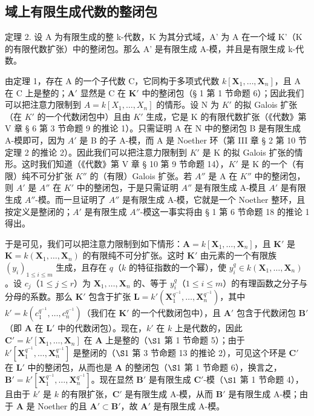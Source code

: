 \subsection{域上有限生成代数的整闭包}

定理 2. 设 A 为有限生成的整 k-代数，K 为其分式域，A' 为 A 在一个域 K'（K 的有限代数扩张）中的整闭包。那么 A' 是有限生成 A-模，并且是有限生成 k-代数。

由定理 1，存在 A 的一个子代数 C，它同构于多项式代数 \(k[\mathbf{X}_1, \ldots, \mathbf{X}_n]\)，且 A 在 C 上是整的；\(\mathbf{A}'\) 显然是 C 在 \(\mathbf{K}'\) 中的整闭包（§ 1 第 1 节命题 6）；因此我们可以把注意力限制到 \(A = k[X_{1}, \ldots, X_{n}]\) 的情形。设 N 为 \(K'\) 的拟 Galois 扩张（在 \(K'\) 的一个代数闭包中）且由 \(K'\) 生成，它是 K 的有限代数扩张（《代数》第 V 章 § 6 第 3 节命题 9 的推论 1）。只需证明 A 在 N 中的整闭包 B 是有限生成 A-模即可，因为 \(A'\) 是 B 的子 A-模，而 A 是 Noether 环（第 III 章 § 2 第 10 节定理 2 的推论 2）。因此我们可以把注意力限制到 \(K'\) 是 K 的拟 Galois 扩张的情形。这时我们知道（《代数》第 V 章 § 10 第 9 节命题 14），\(K'\) 是 K 的一个（有限）纯不可分扩张 \(K''\) 的（有限）Galois 扩张。若 \(A''\) 是 A 在 \(K''\) 中的整闭包，则 \(A'\) 是 \(A''\) 在 \(K'\) 中的整闭包，于是只需证明 \(A''\) 是有限生成 A-模且 \(A'\) 是有限生成 \(A''\)-模。而一旦证明了 \(A''\) 是有限生成 A-模，它就是一个 Noether 整环，且按定义是整闭的；\(A'\) 是有限生成 \(A''\)-模这一事实将由 § 1 第 6 节命题 18 的推论 1 得出。

于是可见，我们可以把注意力限制到如下情形：\(\mathbf{A} = k[\mathbf{X}_1, \ldots, \mathbf{X}_n]\)，且 \(\mathbf{K}'\) 是 \(\mathbf{K} = k(\mathbf{X}_1, \ldots, \mathbf{X}_n)\) 的有限纯不可分扩张。这时 \(\mathbf{K}'\) 由元素的一个有限族 \((y_i)_{1 \leqslant i \leqslant m}\) 生成，且存在 \(q\)（\(k\) 的特征指数的一个幂），使 \(y_i^q \in k(\mathbf{X}_1, \ldots, \mathbf{X}_n)\)。设 \(c_j\)（\(1 \leqslant j \leqslant r\)）为 \(\mathbf{X}_1, \ldots, \mathbf{X}_n\) 的、等于 \(y_i^q\)（\(1 \leqslant i \leqslant m\)）的有理函数之分子与分母的系数。那么 \(\mathbf{K}'\) 包含于扩张 \(\mathbf{L} = k'(\mathbf{X}_1^{q^{-1}}, \ldots, \mathbf{X}_n^{q^{-1}})\)，其中 \(k' = k(c_1^{q^{-1}}, \ldots, c_n^{q^{-1}})\)（我们在 \(\mathbf{K}'\) 的一个代数闭包中），且 \(\mathbf{A}'\) 包含于代数闭包 \(\mathbf{B}'\)（即 \(\mathbf{A}\) 在 \(\mathbf{L}'\) 中的代数闭包）。现在，\(k'\) 在 \(k\) 上是代数的，因此 \(\mathbf{C}' = k'[\mathbf{X}_1, \ldots, \mathbf{X}_n]\) 在 \(\mathbf{A}\) 上是整的（\(\S 1\) 第 1 节命题 5）；由于 \(k'[\mathbf{X}_1^{q^{-1}}, \ldots, \mathbf{X}_n^{q^{-1}}]\) 是整闭的（\(\S 1\) 第 3 节命题 13 的推论 2），可见这个环是 \(\mathbf{C}'\) 在 \(\mathbf{L}'\) 中的整闭包，从而也是 \(\mathbf{A}\) 的整闭包（\(\S 1\) 第 1 节命题 6），换言之，\(\mathbf{B}' = k'[\mathbf{X}_1^{q^{-1}}, \ldots, \mathbf{X}_n^{q^{-1}}]\)。现在显然 \(\mathbf{B}'\) 是有限生成 \(\mathbf{C}'\)-模（\(\S 1\) 第 1 节命题 4），且由于 \(k'\) 是 \(k\) 的有限扩张，\(\mathbf{C}'\) 是有限生成 A-模，从而 \(\mathbf{B}'\) 是有限生成 A-模；由于 \(\mathbf{A}\) 是 Noether 的且 \(\mathbf{A}' \subset \mathbf{B}'\)，故 \(\mathbf{A}'\) 是有限生成 A-模。

